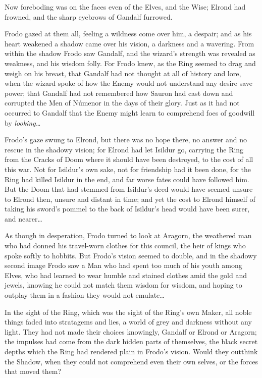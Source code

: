 Now foreboding was on the faces even of the Elves, and the Wise; Elrond had 
frowned, and the sharp eyebrows of Gandalf furrowed.

Frodo gazed at them all, feeling a wildness come over him, a despair; and as 
his heart weakened a shadow came over his vision, a darkness and a wavering. 
From within the shadow Frodo saw Gandalf, and the wizard's strength was 
revealed as weakness, and his wisdom folly. For Frodo knew, as the Ring seemed 
to drag and weigh on his breast, that Gandalf had not thought at all of history 
and lore, when the wizard spoke of how the Enemy would not understand any 
desire save power; that Gandalf had not remembered how Sauron had cast down and 
corrupted the Men of Númenor in the days of their glory. Just as it had not 
occurred to Gandalf that the Enemy might learn to comprehend foes of goodwill 
by \emph{looking{\ldots}}

Frodo's gaze swung to Elrond, but there was no hope there, no answer and no 
rescue in the shadowy vision; for Elrond had let Isildur go, carrying the Ring 
from the Cracks of Doom where it should have been destroyed, to the cost of all 
this war. Not for Isildur's own sake, not for friendship had it been done, for 
the Ring had killed Isildur in the end, and far worse fates could have followed 
him. But the Doom that had stemmed from Isildur's deed would have seemed unsure 
to Elrond then, unsure and distant in time; and yet the cost to Elrond himself 
of taking his sword's pommel to the back of Isildur's head would have been 
surer, and nearer{\ldots}

As though in desperation, Frodo turned to look at Aragorn, the weathered man 
who had donned his travel-worn clothes for this council, the heir of kings who 
spoke softly to hobbits. But Frodo's vision seemed to double, and in the 
shadowy second image Frodo saw a Man who had spent too much of his youth among 
Elves, who had learned to wear humble and stained clothes amid the gold and 
jewels, knowing he could not match them wisdom for wisdom, and hoping to 
outplay them in a fashion they would not emulate{\ldots}

In the sight of the Ring, which was the sight of the Ring's own Maker, all 
noble things faded into stratagems and lies, a world of grey and darkness 
without any light. They had not made their choices knowingly, Gandalf or Elrond 
or Aragorn; the impulses had come from the dark hidden parts of themselves, the 
black secret depths which the Ring had rendered plain in Frodo's vision. Would 
they outthink the Shadow, when they could not comprehend even their own selves, 
or the forces that moved them?

